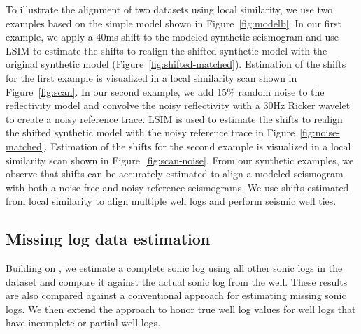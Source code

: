 To illustrate the alignment of two datasets using local similarity, we use two examples based on the simple model shown in Figure~\ref{fig:modelb}. In our first example, we apply a 40ms shift to the modeled synthetic seismogram and use LSIM to estimate the shifts to realign the shifted synthetic model with the original synthetic model (Figure~\ref{fig:shifted-matched}). Estimation of the shifts for the first example is visualized in a local similarity scan shown in Figure~\ref{fig:scan}. In our second example, we add 15\% random noise to the reflectivity model and convolve the noisy reflectivity with a 30Hz Ricker wavelet to create a noisy reference trace. LSIM is used to estimate the shifts to realign the shifted synthetic model with the noisy reference trace in Figure~\ref{fig:noise-matched}. Estimation of the shifts for the second example is visualized in a local similarity scan shown in Figure~\ref{fig:scan-noise}. From our synthetic examples, we observe that shifts can be accurately estimated to align a modeled seismogram with both a noise-free and noisy reference seismograms. We use shifts estimated from local similarity to align multiple well logs and perform seismic well ties.


\subsection{Missing log data estimation}
Building on  \cite[]{bader2018correlation}, we estimate a complete sonic log using all other sonic logs in the dataset and compare it against the actual sonic log from the well. These results are also compared against a conventional approach for estimating missing sonic logs. We then extend the approach to honor true well log values for well logs that have incomplete or partial well logs.

